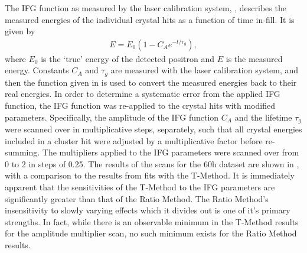 The IFG function as measured by the laser calibration system, , describes the measured energies of the individual crystal hits as a function of time in-fill. It is given by~\cite{IFG}
    \begin{align} \label{eq:IFG}
        E = E_{0}(1 - C_{A} e^{-t/\tau_{g}}),
    \end{align}
where $E_{0}$ is the `true' energy of the detected positron and $E$ is the measured energy. Constants $C_{A}$ and $\tau_{g}$ are measured with the laser calibration system, and then the function given in  is used to convert the measured energies back to their real energies. In order to determine a systematic error from the applied IFG function, the IFG function was re-applied to the crystal hits with modified parameters. Specifically, the amplitude of the IFG function $C_{A}$ and the lifetime $\tau_{g}$  were scanned over in multiplicative steps, separately, such that all crystal energies included in a cluster hit were adjusted by a multiplicative factor before re-summing. The multipliers applied to the IFG parameters were scanned over from 0 to 2 in steps of 0.25. The results of the scans for the 60h dataset are shown in , with a comparison to the results from fits with the T-Method. It is immediately apparent that the sensitivities of the T-Method to the IFG parameters are significantly greater than that of the Ratio Method. The Ratio Method's insensitivity to slowly varying effects which it divides out is one of it's primary strengths. In fact, while there is an observable minimum in the T-Method \chisq results for the amplitude multiplier scan, no such minimum exists for the Ratio Method results.




